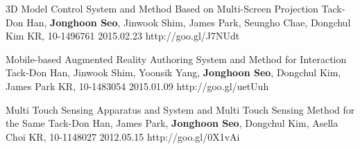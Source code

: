 \begin{cventries}
  \cvpatententry
    {3D Model Control System and Method Based on Multi-Screen Projection} %
    {Tack-Don Han, \textbf{Jonghoon Seo}, Jinwook Shim, James Park, Seungho Chae, Dongchul Kim} %
    {KR, 10-1496761} %
    {2015.02.23} %
    {http://goo.gl/J7NUdt}

  \cvpatententry
    {Mobile-based Augmented Reality Authoring System and Method for Interaction} %
    {Tack-Don Han, Jinwook Shim, Yoonsik Yang, \textbf{Jonghoon Seo}, Dongchul Kim, James Park} %
    {KR, 10-1483054} %
    {2015.01.09} %
    {http://goo.gl/uetUuh}

  \cvpatententry
    {Multi Touch Sensing Apparatus and System and Multi Touch Sensing Method for the Same} %
    {Tack-Don Han, James Park, \textbf{Jonghoon Seo}, Dongchul Kim, Asella Choi} %
    {KR, 10-1148027} %
    {2012.05.15} %
    {http://goo.gl/0X1vAi}
\end{cventries}
